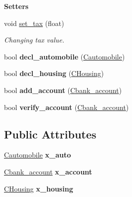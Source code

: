 \begin{Indent}{\bf Setters}\par
\begin{DoxyCompactItemize}
\item 
void \hyperlink{class_ctax__user_a0d860c7b0258e7d6ff654f210099fc77}{set\+\_\+tax} (float)
\begin{DoxyCompactList}\small\item\em Changing tax value. \end{DoxyCompactList}\item 
\hypertarget{class_ctax__user_a0f70d46f61ff7557b63b3f16c02137e3}{bool {\bfseries decl\+\_\+automobile} (\hyperlink{class_cautomobile}{Cautomobile})}\label{class_ctax__user_a0f70d46f61ff7557b63b3f16c02137e3}

\item 
\hypertarget{class_ctax__user_aa0f6e4b32e50f248aeed529b23c66751}{bool {\bfseries decl\+\_\+housing} (\hyperlink{class_c_housing}{C\+Housing})}\label{class_ctax__user_aa0f6e4b32e50f248aeed529b23c66751}

\item 
\hypertarget{class_ctax__user_a44252e27b36c1a12a7bf646d8cfb54ce}{bool {\bfseries add\+\_\+account} (\hyperlink{class_cbank__account}{Cbank\+\_\+account})}\label{class_ctax__user_a44252e27b36c1a12a7bf646d8cfb54ce}

\item 
\hypertarget{class_ctax__user_aab56a5ff02ef3c6cc63ab295ea95c869}{bool {\bfseries verify\+\_\+account} (\hyperlink{class_cbank__account}{Cbank\+\_\+account})}\label{class_ctax__user_aab56a5ff02ef3c6cc63ab295ea95c869}

\end{DoxyCompactItemize}
\end{Indent}
\subsection*{Public Attributes}
\begin{DoxyCompactItemize}
\item 
\hypertarget{class_ctax__user_a809341101dc07cfd884ed1f2564e47bb}{\hyperlink{class_cautomobile}{Cautomobile} {\bfseries x\+\_\+auto}}\label{class_ctax__user_a809341101dc07cfd884ed1f2564e47bb}

\item 
\hypertarget{class_ctax__user_a7adb2c2de9b0cd0a1b316a37bbd06b7e}{\hyperlink{class_cbank__account}{Cbank\+\_\+account} {\bfseries x\+\_\+account}}\label{class_ctax__user_a7adb2c2de9b0cd0a1b316a37bbd06b7e}

\item 
\hypertarget{class_ctax__user_a77308f914bbee6ce2c6c1b265411e70b}{\hyperlink{class_c_housing}{C\+Housing} {\bfseries x\+\_\+housing}}\label{class_ctax__user_a77308f914bbee6ce2c6c1b265411e70b}

\end{DoxyCompactItemize}
